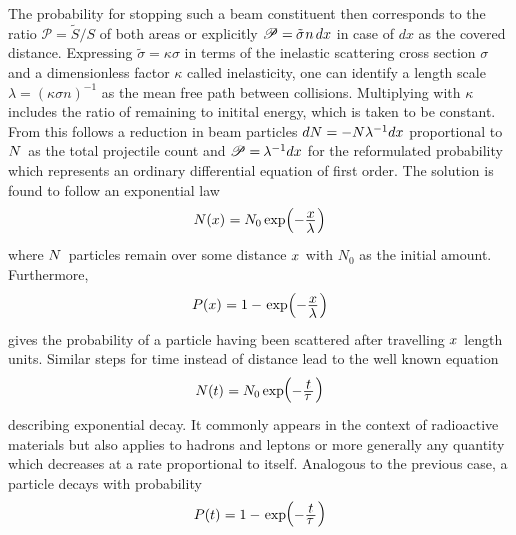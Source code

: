 The probability for stopping such a beam constituent then corresponds to the ratio $\mathscr{P} = \tilde{S} / S$ of both areas or
explicitly $\mathscr{P} = \kern-0.5pt \tilde{\sigma} \kern+0.5pt n \kern+1.5pt dx$ in case of $dx$ as the covered distance.
Expressing $\tilde{\sigma} = \kappa\sigma$ in terms of the inelastic scattering cross section $\sigma$ and a dimensionless factor
$\kappa$ called inelasticity, one can identify a length scale $\lambda = (\kappa\sigma n)^{-1}$ as the mean free path between
collisions. Multiplying with $\kappa$ includes the ratio of remaining to initital energy, which is taken to be constant. From this
follows a reduction in beam particles $dN \kern+0.1pt = - N \lambda^{-1} dx$ proportional to $N \kern+1.0pt$ as the total projectile
count and $\mathscr{P} = \kern-0.6pt \lambda^{-1} dx$ for the reformulated probability which represents an ordinary differential equation
of first order. The solution is found to follow an exponential law
\begin{equation*}
	N(x) \kern+0.4pt = N_0 \exp \Bigl( -\frac{\raisebox{-0.5ex}{$x$}}{\raisebox{0.5ex}{$\lambda \kern+0.3pt$}} \kern+0.5pt \Bigr)
\end{equation*}
where $N \kern+1.0pt$ particles remain over some distance $x \kern+0.5pt$ with $N_0$ as the initial amount. Furthermore,
\begin{equation*}
	P(x) \kern+0.3pt = 1 -
	\kern+0.9pt \exp \Bigl( -\frac{\raisebox{-0.5ex}{$x$}}{\raisebox{0.5ex}{$\lambda \kern+0.3pt$}}\kern+0.5pt \Bigr)
\end{equation*}
gives the probability of a particle having been scattered after travelling $x \kern+0.5pt$ length units. Similar steps
for time instead of distance lead to the well known equation
\begin{equation*}
	N(t) \kern+0.4pt = N_0 \exp \kern-2.0pt
	\raisebox{0.25ex}{\(\Bigl( \raisebox{-0.25ex}{\(-\frac{\raisebox{-0.5ex}{$t$}}{\raisebox{1.0ex}{$\tau \kern+1.0pt$}}\)}
	\kern+0.5pt \Bigr)\)}
\end{equation*}
describing exponential decay. It commonly appears in the context of radioactive materials but also applies to hadrons and leptons
or more generally any quantity which decreases at a rate proportional to itself. Analogous to the previous case, a particle
decays with probability
\begin{equation*}
	P(t) \kern+0.3pt = 1 - \kern+0.9pt \exp \kern-2.0pt
	\raisebox{0.25ex}{\(\Bigl( \raisebox{-0.25ex}{\(-\frac{\raisebox{-0.5ex}{$t$}}{\raisebox{1.0ex}{$\tau \kern+1.0pt$}}\)}
	\kern+0.5pt \Bigr)\)}
\end{equation*}
